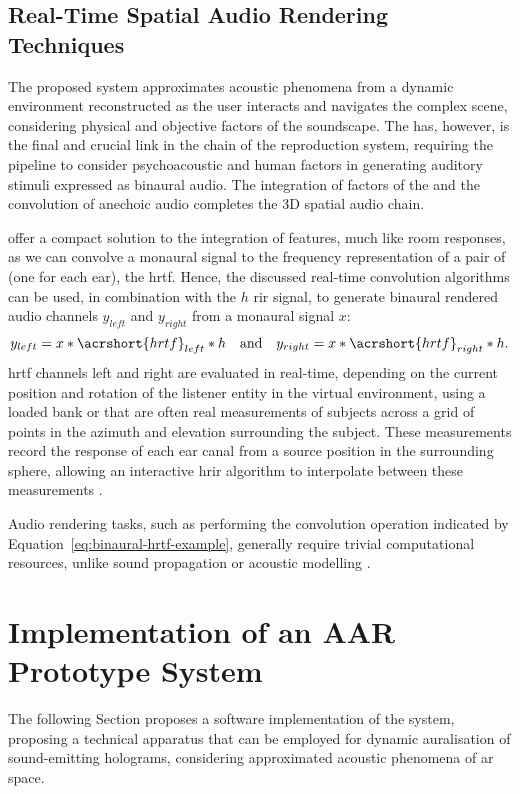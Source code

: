 \subsection{Real-Time Spatial Audio Rendering Techniques}
The proposed system approximates acoustic phenomena from a dynamic environment reconstructed as the user interacts and navigates the complex scene, considering physical and objective factors of the soundscape. The \acrshort{has}, however, is the final and crucial link in the chain of the reproduction system, requiring the pipeline to consider psychoacoustic and human factors in generating auditory stimuli expressed as binaural audio. The integration of factors of the  and the convolution of anechoic audio completes the 3D spatial audio chain.\par
{} offer a compact solution to the integration of  features, much like room responses, as we can convolve a monaural signal to the frequency representation of a pair of  (one for each ear), the \acrfull{hrtf}. Hence, the discussed real-time convolution algorithms \citep{kim2019immersive} can be used, in combination with the $h$ \acrshort{rir} signal, to generate binaural rendered audio channels $y_{left}$ and $y_{right}$ from a monaural signal $x$:
\begin{equation}\label{eq:binaural-hrtf-example}
    y_{left} = x * \acrshort{hrtf}_{left} * h \quad \textrm{and} \quad  y_{right} = x * \acrshort{hrtf}_{right} * h \textrm{.}
\end{equation}
\acrshort{hrtf} channels left and right are evaluated in real-time, depending on the current position and rotation of the listener entity in the virtual environment, using a loaded bank or  that are often real measurements of subjects across a grid of points in the azimuth and elevation surrounding the subject. These measurements record the response of each ear canal from a source position in the surrounding sphere, allowing an interactive \acrshort{hrir} algorithm to interpolate between these measurements \citep{hoene2017mysofa}.\par
Audio rendering tasks, such as performing the convolution operation indicated by Equation~\ref{eq:binaural-hrtf-example}, generally require trivial computational resources, unlike sound propagation or acoustic modelling \citep{liu2020sound}. 

\section{Implementation of an AAR Prototype System}
The following Section proposes a software implementation of the system, proposing a technical apparatus that can be employed for dynamic auralisation of sound-emitting holograms, considering approximated acoustic phenomena of \acrshort{ar} space.

